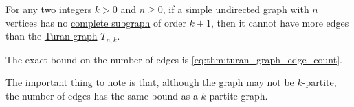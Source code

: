 \begin{theorem}\label{thm:turans_theorem}
  For any two integers \( k > 0 \) and \( n \geq 0 \), if a \hyperref[def:undirected_graph]{simple undirected graph} with \( n \) vertices has no \hyperref[def:complete_subgraph]{complete subgraph} of order \( k + 1 \), then it cannot have more edges than the \hyperref[def:turan_graph]{Turan graph} \( T_{n,k} \).
\end{theorem}
\begin{comments}
  \item The exact bound on the number of edges is \eqref{eq:thm:turan_graph_edge_count}.

  \item The important thing to note is that, although the graph may not be \( k \)-partite, the number of edges has the same bound as a \( k \)-partite graph.
\end{comments}

